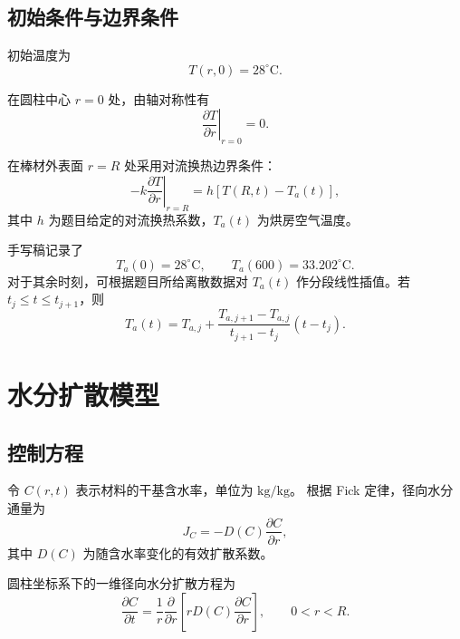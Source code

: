 \documentclass[UTF8,a4paper,12pt]{ctexart}
\begin{document}
\subsection{初始条件与边界条件}

初始温度为
\begin{equation}
    T(r,0)=28^\circ\mathrm{C}.
\end{equation}

在圆柱中心 $r=0$ 处，由轴对称性有
\begin{equation}
    \left.\frac{\partial T}{\partial r}\right|_{r=0}=0.
    \label{eq:heat-center-bc}
\end{equation}

在棒材外表面 $r=R$ 处采用对流换热边界条件：
\begin{equation}
    -k\left.\frac{\partial T}{\partial r}\right|_{r=R}
    =
    h\left[T(R,t)-T_a(t)\right],
    \label{eq:heat-surface-bc}
\end{equation}
其中 $h$ 为题目给定的对流换热系数，$T_a(t)$ 为烘房空气温度。

手写稿记录了
\begin{equation}
    T_a(0)=28^\circ\mathrm{C},\qquad
    T_a(600)=33.202^\circ\mathrm{C}.
\end{equation}
对于其余时刻，可根据题目所给离散数据对 $T_a(t)$ 作分段线性插值。若
$t_j\le t\le t_{j+1}$，则
\begin{equation}
    T_a(t)
    =
    T_{a,j}
    +
    \frac{T_{a,j+1}-T_{a,j}}{t_{j+1}-t_j}
    (t-t_j).
    \label{eq:Ta-interp}
\end{equation}

\section{水分扩散模型}

\subsection{控制方程}

令 $C(r,t)$ 表示材料的干基含水率，单位为 $\mathrm{kg/kg}$。
根据 Fick 定律，径向水分通量为
\begin{equation}
    J_C=-D(C)\frac{\partial C}{\partial r},
\end{equation}
其中 $D(C)$ 为随含水率变化的有效扩散系数。

圆柱坐标系下的一维径向水分扩散方程为
\begin{equation}
    \frac{\partial C}{\partial t}
    =
    \frac{1}{r}\frac{\partial}{\partial r}
    \left[
        rD(C)\frac{\partial C}{\partial r}
    \right],
    \qquad 0<r<R.
    \label{eq:moisture-pde}
\end{equation}
\end{document}
